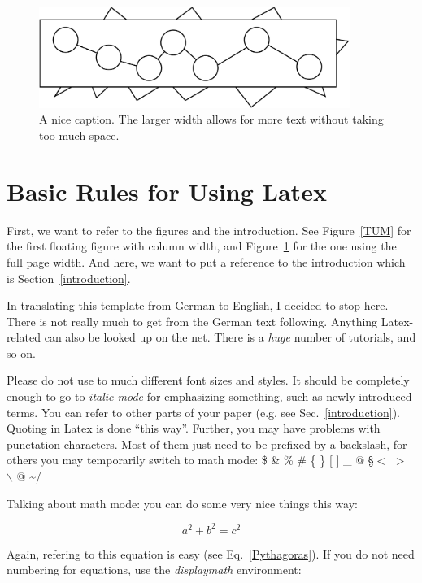 \documentclass[A4,10pt]{article}
\begin{document}
\begin{figure}[t]
\centerline{
\includegraphics[width=0.9\textwidth]{test.pdf}
}
\caption{A nice caption. The larger width allows for more text without
taking too much space.}
\label{Fig2}
\end{figure}


\section{Basic Rules for Using Latex}

First, we want to refer to the figures and the introduction.
See Figure~\ref{TUM} for the first floating figure with column width,
and Figure~\ref{Fig2} for the one using the full page width.
And here, we want to put a reference to the introduction which is
Section~\ref{introduction}.

In translating this template from German to English, I decided to
stop here. There is not really much to get from the German text
following. Anything Latex-related can also be looked up on the
net. There is a {\it huge} number of tutorials, and so on.

Please do not use to much different font sizes and styles. It should
be completely enough to go to {\em italic mode} for emphasizing something,
such as newly introduced terms.
You can refer to other parts of your paper (e.g. see 
Sec.~\ref{introduction}).
Quoting in Latex is done ``this way''.
Further, you may have problems with punctation characters.
Most of them just need to be prefixed by a backslash, for others you may
temporarily switch to math mode:
\$ \& \% \# \{ \} [ ] \_ @ \S $<$ $>$ $\backslash$ @ \textasciitilde /
    
Talking about math mode: you can do some very nice things this way:

\begin{equation}
a^2 + b^2 = c^2
\label{Pythagoras}
\end{equation}

Again, refering to this equation is easy (see Eq.~\ref{Pythagoras}).
If you do not need numbering for equations, use the {\em displaymath}
environment:
\end{document}
